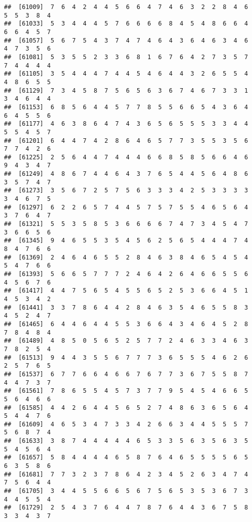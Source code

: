 \documentclass[
]{book}
\begin{document}
\begin{verbatim}
##  [61009]  7  6  4  2  4  4  5  6  6  4  7  4  6  3  2  2  8  4  6  5  5  3  8  4
##  [61033]  5  3  4  4  4  5  7  6  6  6  6  8  4  5  4  8  6  6  4  6  6  4  5  7
##  [61057]  5  6  7  5  4  3  7  4  7  4  6  4  3  6  4  6  3  4  6  4  7  3  5  6
##  [61081]  5  3  5  5  2  3  3  6  8  1  6  7  6  4  2  7  3  5  7  7  4  4  4  4
##  [61105]  3  5  4  4  4  7  4  4  5  4  6  4  4  3  2  6  5  5  4  4  8  6  5  5
##  [61129]  7  3  4  5  8  7  5  6  5  6  3  6  7  4  6  7  3  3  1  3  4  6  4  4
##  [61153]  6  8  5  6  4  4  5  7  7  8  5  5  6  6  5  4  3  6  4  6  4  5  5  6
##  [61177]  4  6  3  8  6  4  7  4  3  6  5  6  5  5  5  3  3  4  4  5  5  4  5  7
##  [61201]  6  4  4  7  4  2  8  6  4  6  5  7  7  3  5  5  3  5  6  7  7  4  2  6
##  [61225]  2  5  6  4  4  7  4  4  4  6  6  8  5  8  5  6  6  4  6  9  4  3  4  7
##  [61249]  4  8  6  7  4  4  6  4  3  7  6  5  4  4  5  6  4  8  6  3  5  7  4  7
##  [61273]  3  5  6  7  2  5  7  5  6  3  3  3  4  2  5  3  3  3  3  3  4  6  7  5
##  [61297]  6  2  2  6  5  7  4  4  5  7  5  7  5  5  4  6  5  6  4  3  7  6  4  7
##  [61321]  5  5  3  5  8  5  3  6  6  6  6  7  4  7  3  4  5  4  7  3  6  6  5  6
##  [61345]  9  4  6  5  5  3  5  4  5  6  2  5  6  5  4  4  4  7  4  8  4  7  6  6
##  [61369]  2  4  6  4  6  5  5  2  8  4  6  3  8  4  6  5  4  5  4  5  4  7  6  6
##  [61393]  5  6  6  5  7  7  7  2  4  6  4  2  6  4  6  6  5  5  6  4  5  6  7  6
##  [61417]  4  4  7  5  6  5  4  5  5  6  5  2  5  3  6  6  4  5  1  4  5  3  4  2
##  [61441]  3  3  7  8  6  4  4  2  8  4  6  3  5  4  6  5  5  8  3  4  5  2  4  7
##  [61465]  6  4  4  6  4  4  5  5  3  6  6  4  3  4  6  4  5  2  8  7  8  4  8  4
##  [61489]  4  8  5  0  5  6  5  2  5  7  7  2  4  6  3  3  4  6  3  7  8  2  5  4
##  [61513]  9  4  4  3  5  5  6  7  7  7  3  6  5  5  5  4  6  2  6  2  5  7  6  5
##  [61537]  6  7  7  6  6  4  6  6  7  6  7  7  3  6  7  5  5  8  7  4  4  7  3  7
##  [61561]  7  8  6  5  5  4  5  7  3  7  7  9  5  4  5  4  6  6  5  5  6  4  6  6
##  [61585]  4  4  2  6  4  4  5  6  5  2  7  4  8  6  3  6  5  6  4  5  4  4  7  6
##  [61609]  4  6  5  3  4  7  3  3  4  2  6  6  3  4  4  5  5  5  7  5  6  8  7  4
##  [61633]  3  8  7  4  4  4  4  4  6  5  3  3  5  6  3  5  6  3  5  5  4  5  6  4
##  [61657]  5  8  4  4  4  4  6  5  8  7  6  4  6  5  5  5  5  6  5  6  3  5  8  6
##  [61681]  7  7  3  2  3  7  8  6  4  2  3  4  5  2  6  3  4  7  4  7  5  6  4  4
##  [61705]  3  4  4  5  5  6  6  5  6  7  5  6  5  3  5  3  6  7  3  4  4  5  5  4
##  [61729]  2  5  4  3  7  6  4  4  7  8  7  6  4  4  3  6  7  5  8  3  3  4  3  7

\end{verbatim}
\end{document}

